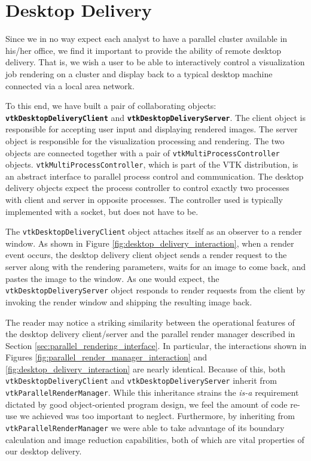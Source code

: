 \documentclass[letterpaper]{acmsiggraph}
\newcommand{\cidentifier}[1]{\texttt{#1}}
\newcommand{\keyterm}[1]{\textbf{#1}}
\begin{document}
  \section{Desktop Delivery}
  \label{sec:desktop_delivery}

  Since we in no way expect each analyst to have a parallel cluster
  available in his/her office, we find it important to provide the ability
  of remote desktop delivery.  That is, we wish a user to be able to
  interactively control a visualization job rendering on a cluster and
  display back to a typical desktop machine connected via a local area
  network.

  To this end, we have built a pair of collaborating objects:
  \keyterm{\cidentifier{vtk\-Desktop\-Delivery\-Client}} and
  \keyterm{\cidentifier{vtk\-Desktop\-Delivery\-Server}}.  The client
  object is responsible for accepting user input and displaying rendered
  images.  The server object is responsible for the visualization
  processing and rendering.  The two objects are connected together with a
  pair of \cidentifier{vtk\-Multi\-Process\-Controller} objects.
  \cidentifier{vtk\-Multi\-Process\-Controller}, which is part of the VTK
  distribution, is an abstract interface to parallel process control and
  communication.  The desktop delivery objects expect the process
  controller to control exactly two processes with client and server in
  opposite processes.  The controller used is typically implemented with a
  socket, but does not have to be.

  The \cidentifier{vtk\-Desktop\-Delivery\-Client} object attaches itself
  as an observer to a render window.  As shown in Figure
  \ref{fig:desktop_delivery_interaction}, when a render event occurs, the
  desktop delivery client object sends a render request to the server along
  with the rendering parameters, waits for an image to come back, and
  pastes the image to the window.  As one would expect, the
  \cidentifier{vtk\-Desktop\-Delivery\-Server} object responds to render
  requests from the client by invoking the render window and shipping the
  resulting image back.

  The reader may notice a striking similarity between the operational
  features of the desktop delivery client/server and the parallel render
  manager described in Section \ref{sec:parallel_rendering_interface}.  In
  particular, the interactions shown in Figures
  \ref{fig:parallel_render_manager_interaction} and
  \ref{fig:desktop_delivery_interaction} are nearly identical.  Because of
  this, both \cidentifier{vtk\-Desktop\-Delivery\-Client} and
  \cidentifier{vtk\-Desktop\-Delivery\-Server} inherit from
  \cidentifier{vtk\-Parallel\-Render\-Manager}.  While this inheritance
  strains the \emph{is-a} requirement dictated by good object-oriented program
  design, we feel the amount of code re-use we achieved was too important
  to neglect.  Furthermore, by inheriting from
  \cidentifier{vtk\-Parallel\-Render\-Manager} we were able to take
  advantage of its boundary calculation and image reduction capabilities,
  both of which are vital properties of our desktop delivery.
\end{document}
